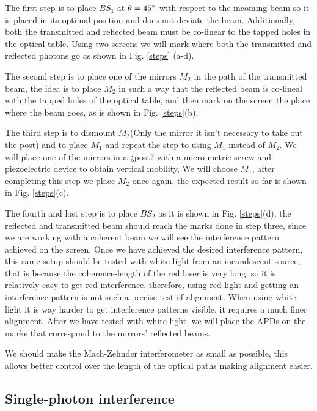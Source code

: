 \documentclass[12pt]{book}
\begin{document}
The first step is to place $BS_{1}$ at $\theta=45\degree$ with respect to the incoming beam so it is placed in its optimal position and does not deviate the beam. Additionally, both the transmitted and reflected beam must be co-linear to the tapped holes in the optical table. Using two screens we will mark where both the transmitted and reflected photons go as shown in Fig. \ref{steps} (a-d).

The second step is to place one of the mirrors $M_{2}$ in the path of the transmitted beam, the idea is to place $M_{2}$ in such a way that the reflected beam is co-lineal with the tapped holes of the optical table, and then mark on the screen the place where the beam goes, as is shown in Fig. \ref{steps}(b).

The third step is to dismount $M_{2}$(Only the mirror it isn't necessary to take out the post) and to place $M_{1}$ and repeat the step to using $M_{1}$ instead of $M_{2}$. We will place one of the mirrors in a ¿post? with a micro-metric screw and piezoelectric device to obtain vertical mobility, We will choose $M_{1}$, after completing this step we place $M_{2}$ once again, the expected result so far is shown in Fig. \ref{steps}(c).

The fourth and last step is to place $BS_{2}$ as it is shown in Fig. \ref{steps}(d), the reflected and transmitted beam should reach the marks done in step three, since we are working with a coherent beam we will see the interference pattern achieved on the screen. Once we have achieved the desired interference pattern, this same setup should be tested with white light from an incandescent source, that is because the coherence-length of the red laser is very long, so it is relatively easy to get red interference, therefore, using red light and getting an interference pattern is not such a precise test of alignment. When using white light it is way harder to get interference patterns visible, it requires a much finer alignment. After we have tested with white light, we will place the APDs on the marks that correspond to the mirrors' reflected beams.


We should make the Mach-Zehnder interferometer as small as possible, this allows better control over the length of the optical paths making alignment easier.

\subsection{Single-photon interference}
\end{document}
